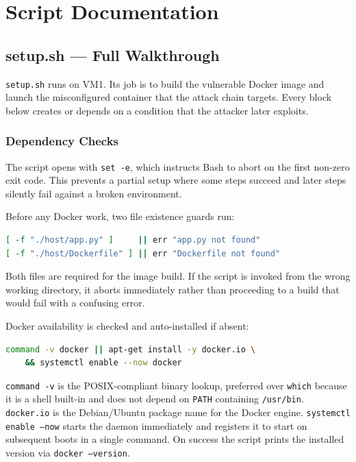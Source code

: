 \chapter{Script Documentation}

\section{setup.sh --- Full Walkthrough}

\texttt{setup.sh} runs on VM1. Its job is to build the vulnerable Docker image and launch the misconfigured container that the attack chain targets. Every block below creates or depends on a condition that the attacker later exploits.

\subsection{Dependency Checks}

The script opens with \texttt{set -e}, which instructs Bash to abort on the first non-zero exit code. This prevents a partial setup where some steps succeed and later steps silently fail against a broken environment.

Before any Docker work, two file existence guards run:

\begin{lstlisting}[language=bash]
[ -f "./host/app.py" ]     || err "app.py not found"
[ -f "./host/Dockerfile" ] || err "Dockerfile not found"
\end{lstlisting}

Both files are required for the image build. If the script is invoked from the wrong working directory, it aborts immediately rather than proceeding to a build that would fail with a confusing error.

Docker availability is checked and auto-installed if absent:

\begin{lstlisting}[language=bash]
command -v docker || apt-get install -y docker.io \
    && systemctl enable --now docker
\end{lstlisting}

\texttt{command -v} is the POSIX-compliant binary lookup, preferred over \texttt{which} because it is a shell built-in and does not depend on \texttt{PATH} containing \texttt{/usr/bin}. \texttt{docker.io} is the Debian/Ubuntu package name for the Docker engine. \texttt{systemctl enable --now} starts the daemon immediately and registers it to start on subsequent boots in a single command. On success the script prints the installed version via \texttt{docker --version}.

